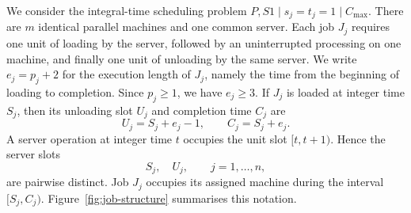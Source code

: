 \documentclass[11pt]{article}
\begin{document}
We consider the integral-time scheduling problem
$ P,S1\mid s_j=t_j=1\mid C_{\max}.$
There are \(m\) identical parallel machines and one common server. Each job
\(J_j\) requires one unit of loading by the server, followed by an uninterrupted
processing on one machine, and finally one unit of unloading by the same server.
We write $e_j=p_j+2$ for the execution length of \(J_j\), namely the time from the beginning of
loading to completion. Since \(p_j\ge1\), we have \(e_j\ge3\). If \(J_j\) is
loaded at integer time \(S_j\), then its unloading slot $U_j$ and completion time $C_j$ are
\[
        U_j=S_j+e_j-1,
        \qquad
        C_j=S_j+e_j .
\]
A server operation at integer time \(t\) occupies the unit slot \([t,t+1)\).
Hence the server slots
\[
        S_j,\quad U_j,\qquad j=1,\ldots,n,
\]
are pairwise distinct. Job \(J_j\) occupies its assigned machine during the interval $[S_j,C_j).$ Figure~\ref{fig:job-structure} summarises this notation.
\end{document}
